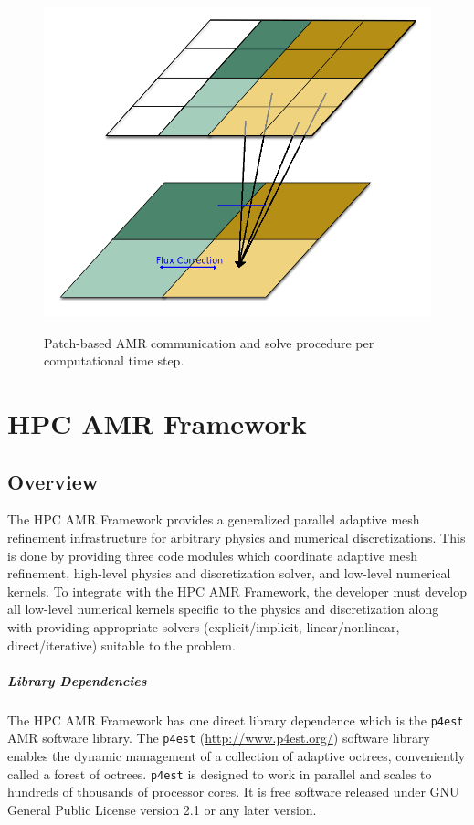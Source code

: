 \documentclass[11pt]{book}
\begin{document}
\begin{figure}[t]
\begin{subfigmatrix}{3}
  {\includegraphics{Images/AMR/coarsen2.png}}
 \end{subfigmatrix}
 \caption{Patch-based AMR communication and solve procedure per computational time step.}
 \label{Patch-AMR-Solve}
\end{figure}




\part{HPC AMR Framework}

\chapter{Overview}
The HPC AMR Framework provides a generalized parallel adaptive mesh refinement infrastructure for arbitrary physics and numerical discretizations. 
This is done by providing three code modules which coordinate adaptive mesh refinement, high-level physics and discretization solver, and low-level numerical kernels. 
To integrate with the HPC AMR Framework, the developer must develop all low-level numerical kernels specific to the physics and discretization 
along with providing appropriate solvers (explicit/implicit, linear/nonlinear, direct/iterative) suitable to the problem.


\subsubsection{Library Dependencies}
The HPC AMR Framework has one direct library dependence which is the \texttt{p4est} AMR software library.
The \texttt{p4est} (\url{http://www.p4est.org/}) software library enables the dynamic management of a collection of adaptive octrees, conveniently called a forest of octrees. \texttt{p4est} is designed to work in parallel and scales to hundreds of thousands of processor cores. It is free software released under GNU General Public License version 2.1 or any later version. 
\medskip
\end{document}
